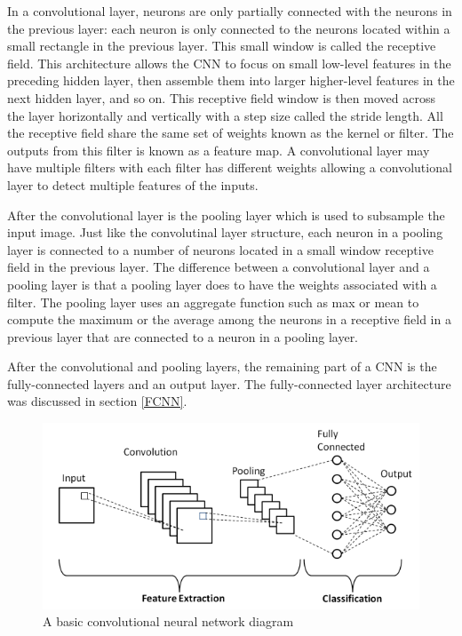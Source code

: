\documentclass{article}
\begin{document}
In a convolutional layer, neurons are only partially connected with the neurons in the previous layer: each neuron is only connected to the neurons located within a small rectangle in the previous layer. This small window is called the receptive field. This architecture allows the CNN to focus on small low-level features in the preceding hidden layer, then assemble them into larger higher-level features in the next hidden layer, and so on. This receptive field window is then moved across the layer horizontally and vertically with a step size called the stride length. All the receptive field share the same set of weights known as the kernel or filter. The outputs from this filter is known as a feature map. A convolutional layer may have multiple filters with each filter has different weights allowing a convolutional layer to detect multiple features of the inputs. 

After the convolutional layer is the pooling layer which is used to subsample the input image. Just like the convolutinal layer structure, each neuron in a pooling layer is connected to a number of neurons located in a small window receptive field in the previous layer. The difference between a convolutional layer and a pooling layer is that a pooling layer does to have the weights associated with a filter. The pooling layer uses an aggregate function such as max or mean to compute the maximum or the average among the neurons in a receptive field in a previous layer that are connected to a neuron in a pooling layer.

After the convolutional and pooling layers, the remaining part of a CNN is the fully-connected layers and an output layer. The fully-connected layer architecture was discussed in section \ref{FCNN}.

\begin{figure}
\centering
\includegraphics[width=1.0\textwidth]{CNN-architecture.png}
\caption{A basic convolutional neural network diagram}
\label{fig:CNN}
\end{figure}
\end{document}

